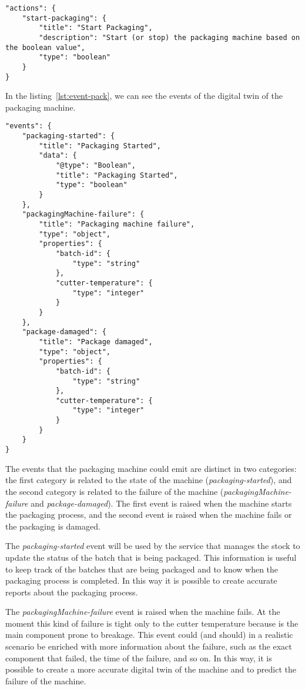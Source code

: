 \begin{lstlisting}[caption={Actions of the packaging machine Thing Model.},label={lst:action-pack}]
"actions": {
	"start-packaging": {
		"title": "Start Packaging",
		"description": "Start (or stop) the packaging machine based on the boolean value",
		"type": "boolean"
	}
}
\end{lstlisting}

In the listing~\ref{lst:event-pack}, we can see the events of the digital twin of the packaging machine.

\begin{lstlisting}[caption={Events of the packaging machine Thing Model.},label={lst:event-pack}]
"events": {
	"packaging-started": {
		"title": "Packaging Started",
		"data": {
			"@type": "Boolean",
			"title": "Packaging Started",
			"type": "boolean"
		}
	},
	"packagingMachine-failure": {
		"title": "Packaging machine failure",
		"type": "object",
		"properties": {
			"batch-id": {
				"type": "string"
			},
			"cutter-temperature": {
				"type": "integer"
			}
		}
	},
	"package-damaged": {
		"title": "Package damaged",
		"type": "object",
		"properties": {
			"batch-id": {
				"type": "string"
			},
			"cutter-temperature": {
				"type": "integer"
			}
		}
	}
}
\end{lstlisting}

The events that the packaging machine could emit are distinct in two categories: the first category is related to the state of the machine (\textit{packaging-started}), and the second category is related to the failure of the machine (\textit{packagingMachine-failure} and \textit{package-damaged}). The first event is raised when the machine starts the packaging process, and the second event is raised when the machine fails or the packaging is damaged.

The \textit{packaging-started} event will be used by the service that manages the stock to update the status of the batch that is being packaged.
This information is useful to keep track of the batches that are being packaged and to know when the packaging process is completed. In this way it
is possible to create accurate reports about the packaging process.

The \textit{packagingMachine-failure} event is raised when the machine fails. At the moment this kind of failure is tight only to the cutter temperature because is the main component prone to breakage. This event could (and should) in a realistic scenario be enriched with more information about the failure, such as the exact component that failed, the time of the failure, and so on. In this way, it is possible to create a more accurate digital twin of the machine and to predict the failure of the machine.

